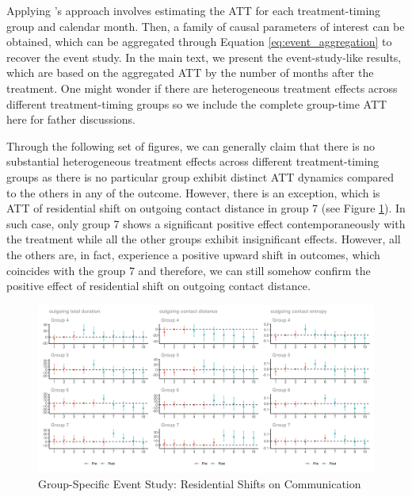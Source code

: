 
\label{complete_group_time_att_dynamics}
Applying \cite{callaway2021difference}'s approach involves estimating the ATT for each treatment-timing group and calendar month. Then, a family of causal parameters of interest can be obtained, which can be aggregated through Equation \ref{eq:event_aggregation} to recover the event study. In the main text, we present the event-study-like results, which are based on the aggregated ATT by the number of months after the treatment. One might wonder if there are heterogeneous treatment effects across different treatment-timing groups so we include the complete group-time ATT here for father discussions.

Through the following set of figures, we can generally claim that there is no substantial heterogeneous treatment effects across different treatment-timing groups as there is no particular group exhibit distinct ATT dynamics compared to the others in any of the outcome. However, there is an exception, which is ATT of residential shift on outgoing contact distance in group 7 (see Figure \ref{fig:attgt_residential_shift_mobile_communication_network}). In such case, only group 7 shows a significant positive effect contemporaneously with the treatment while all the other groups exhibit insignificant effects. However, all the others are, in fact, experience a positive upward shift in outcomes, which coincides with the group 7 and therefore, we can still somehow confirm the positive effect of residential shift on outgoing contact distance.

\clearpage\newpage
\begin{figure}[ht!]
\centering
\caption{Group-Specific Event Study: Residential Shifts on Communication}


\includegraphics[width=1.5\textwidth, angle=90]{figures/csdid/cohort_specific_ATT_dynamics/residential_shift_mobile_communication_network.png}

\label{fig:attgt_residential_shift_mobile_communication_network}
\end{figure}


